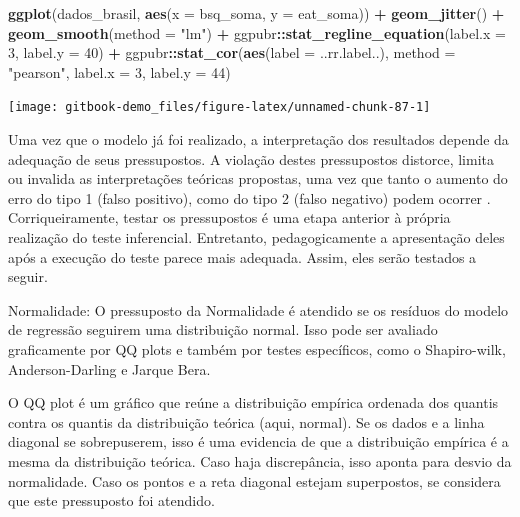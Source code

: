 \documentclass[
]{book}
\newenvironment{Shaded}{\begin{snugshade}}{\end{snugshade}}
\newcommand{\DataTypeTok}[1]{\textcolor[rgb]{0.13,0.29,0.53}{#1}}
\newcommand{\DecValTok}[1]{\textcolor[rgb]{0.00,0.00,0.81}{#1}}
\newcommand{\KeywordTok}[1]{\textcolor[rgb]{0.13,0.29,0.53}{\textbf{#1}}}
\newcommand{\NormalTok}[1]{#1}
\newcommand{\OperatorTok}[1]{\textcolor[rgb]{0.81,0.36,0.00}{\textbf{#1}}}
\newcommand{\StringTok}[1]{\textcolor[rgb]{0.31,0.60,0.02}{#1}}
\begin{document}
\begin{Shaded}
\begin{Highlighting}[]
\KeywordTok{ggplot}\NormalTok{(dados_brasil, }\KeywordTok{aes}\NormalTok{(}\DataTypeTok{x =}\NormalTok{ bsq_soma, }\DataTypeTok{y =}\NormalTok{ eat_soma)) }\OperatorTok{+}
\StringTok{  }\KeywordTok{geom_jitter}\NormalTok{() }\OperatorTok{+}\StringTok{ }\KeywordTok{geom_smooth}\NormalTok{(}\DataTypeTok{method =} \StringTok{"lm"}\NormalTok{) }\OperatorTok{+}\StringTok{ }
\StringTok{  }\NormalTok{ggpubr}\OperatorTok{::}\KeywordTok{stat_regline_equation}\NormalTok{(}\DataTypeTok{label.x =} \DecValTok{3}\NormalTok{, }\DataTypeTok{label.y =} \DecValTok{40}\NormalTok{) }\OperatorTok{+}
\StringTok{  }\NormalTok{ggpubr}\OperatorTok{::}\KeywordTok{stat_cor}\NormalTok{(}\KeywordTok{aes}\NormalTok{(}\DataTypeTok{label =}\NormalTok{  ..rr.label..), }\DataTypeTok{method =} \StringTok{"pearson"}\NormalTok{, }\DataTypeTok{label.x =} \DecValTok{3}\NormalTok{, }\DataTypeTok{label.y =} \DecValTok{44}\NormalTok{)}
\end{Highlighting}
\end{Shaded}

\begin{center}\texttt{[image: gitbook-demo\_files/figure-latex/unnamed-chunk-87-1]} \end{center}

Uma vez que o modelo já foi realizado, a interpretação dos resultados depende da adequação de seus pressupostos. A violação destes pressupostos distorce, limita ou invalida as interpretações teóricas propostas, uma vez que tanto o aumento do erro do tipo 1 (falso positivo), como do tipo 2 (falso negativo) podem ocorrer \citep{Lix1996, Barker2015, Ernst2017}. Corriqueiramente, testar os pressupostos é uma etapa anterior à própria realização do teste inferencial. Entretanto, pedagogicamente a apresentação deles após a execução do teste parece mais adequada. Assim, eles serão testados a seguir.

Normalidade: O pressuposto da Normalidade é atendido se os resíduos do modelo de regressão seguirem uma distribuição normal. Isso pode ser avaliado graficamente por QQ plots e também por testes específicos, como o Shapiro-wilk, Anderson-Darling e Jarque Bera.

O QQ plot é um gráfico que reúne a distribuição empírica ordenada dos quantis contra os quantis da distribuição teórica (aqui, normal). Se os dados e a linha diagonal se sobrepuserem, isso é uma evidencia de que a distribuição empírica é a mesma da distribuição teórica. Caso haja discrepância, isso aponta para desvio da normalidade. Caso os pontos e a reta diagonal estejam superpostos, se considera que este pressuposto foi atendido.
\end{document}
